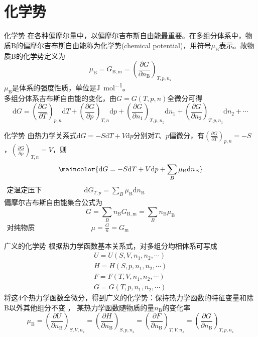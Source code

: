 \section{化学势}


\begin{frame}{化学势}
    在各种偏摩尔量中，以偏摩尔吉布斯自由能最重要。在多组分体系中，物质B的偏摩尔吉布斯自由能称为化学势(chemical potential)，用符号$\mu_\mathrm{B}$表示。故物质B的化学势定义为
    $$\mu_{\mathrm{B}}=G_{\mathrm{B}, \mathrm{m}}=\left(\frac{\partial G}{\partial n_{\mathrm{B}}}\right)_{T, p, n_{z}}$$
    $\mu_\mathrm{B}$是体系的强度性质，单位是\si{J.mol^{-1}}。
    \\多组分体系吉布斯自由能的变化，由$G=G(T,p,n)$全微分可得
    $$\mathrm{d}G=\left(\frac{\partial G}{\partial T}\right)_{p,n}\mathrm{d}T + \left(\frac{\partial G}{\partial p}\right)_{T,n}\mathrm{d}p + \left(\frac{\partial G}{\partial n_1}\right)_{T,p,n_z}\mathrm{d}n_1 + \left(\frac{\partial G}{\partial n_2}\right)_{T,p,n_z}\mathrm{d}n_2 + \cdots$$

\end{frame}


\begin{frame}{化学势}
    由热力学关系式$\mathrm{d}G=-S\mathrm{d}T+V\mathrm{d}p$分别对$T$、$p$偏微分，有$\left(\frac{\partial G}{\partial T}\right)_{p,n}=-S$，$\left(\frac{\partial G}{\partial p}\right)_{T,n}=V$，则
    $$\maincolor{\mathrm{d}G=-S\mathrm{d}T+V\mathrm{d}p+\sum_B{\mu_\mathrm{B}\mathrm{d}n_\mathrm{B}}}$$
    $\begin{aligned}
        \text{定温定压下} \qquad\qquad\qquad   \mathrm{d}G_{T,p}=\sum_B{\mu_\mathrm{B}\mathrm{d}n_\mathrm{B}}
    \end{aligned}$
    \\偏摩尔吉布斯自由能集合公式为
    $$G=\sum_Bn_\mathrm{B}{G_\mathrm{B,m}}=\sum_B n_\mathrm{B} \mu_\mathrm{B}$$
    $\begin{aligned}
        \text{对纯物质}\qquad\qquad\qquad\qquad\mu = \frac{G}{n} = G_\mathrm{m}
    \end{aligned}$    
\end{frame}


\begin{frame}{广义的化学势}
    根据热力学函数基本关系式，对多组分均相体系可写成
    $$\begin{array}{c}
        U=U(S,V,n_1,n_2,\cdots)\\
        H=H(S,p,n_1,n_2,\cdots)\\
        F=F(T,V,n_1,n_2,\cdots)\\
        G=G(T,p,n_1,n_2,\cdots)
    \end{array}$$
    将这4个热力学函数全微分，得到广义的化学势：保持热力学函数的特征变量和除B以外其他组分不变 ， 某热力学函数随物质的量$n_{\mathrm{B}}$的变化率
    $$\mu_{\mathrm{B}}=\left(\frac{\partial U}{\partial n_{\mathrm{B}}}\right)_{S, V, n_{z}}=\left(\frac{\partial H}{\partial n_{\mathrm{B}}}\right)_{S, p, n_{z}}=\left(\frac{\partial F}{\partial n_{\mathrm{B}}}\right)_{T, V, n_{z}}=\left(\frac{\partial G}{\partial n_{\mathrm{B}}}\right)_{T, p, n_{z}}$$
\end{frame}


